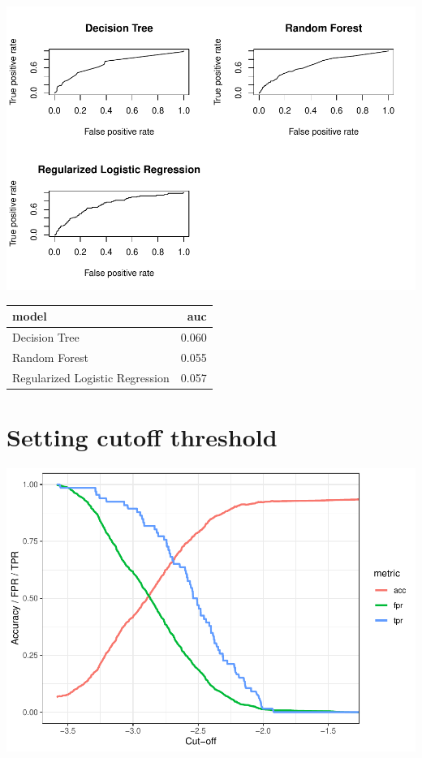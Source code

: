 \documentclass[
  12pt,
  oneside]{report}
\begin{document}
\includegraphics[width=1.5\linewidth]{leroy_francois_hw2_files/figure-latex/unnamed-chunk-17-1}

\begin{table}[H]
\centering
\begin{tabular}{l|r}
\hline
model & auc\\
\hline
Decision Tree & 0.060\\
\hline
Random Forest & 0.055\\
\hline
Regularized Logistic Regression & 0.057\\
\hline
\end{tabular}
\end{table}

\hypertarget{setting-cutoff-threshold}{%
\section{Setting cutoff threshold}\label{setting-cutoff-threshold}}

\includegraphics{leroy_francois_hw2_files/figure-latex/unnamed-chunk-19-1.pdf}
\end{document}
